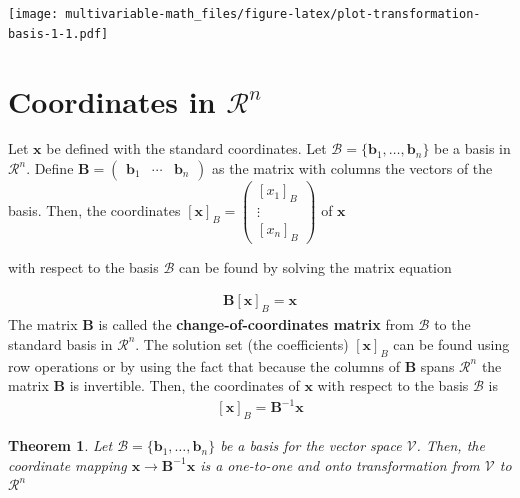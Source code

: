 \documentclass[
]{book}
\newtheorem{theorem}{Theorem}[chapter]
\theoremstyle{definition}
\theoremstyle{definition}
\theoremstyle{definition}
\theoremstyle{definition}
\theoremstyle{remark}
\begin{document}
\texttt{[image: multivariable-math\_files/figure-latex/plot-transformation-basis-1-1.pdf]}

\hypertarget{coordinates-in-mathcalrn}{%
\section{\texorpdfstring{Coordinates in \(\mathcal{R}^n\)}{Coordinates in \textbackslash mathcal\{R\}\^{}n}}\label{coordinates-in-mathcalrn}}

Let \(\mathbf{x}\) be defined with the standard coordinates. Let \(\mathcal{B} = \{ \mathbf{b}_1, \ldots, \mathbf{b}_n \}\) be a basis in \(\mathcal{R}^n\). Define \(\mathbf{B} = \begin{pmatrix} \mathbf{b}_1 & \cdots & \mathbf{b}_n \end{pmatrix}\) as the matrix with columns the vectors of the basis. Then, the coordinates \(\left[\mathbf{x}\right]_B = \begin{pmatrix} [x_1]_B \\ \vdots \\ [x_n]_B \end{pmatrix}\) of \(\mathbf{x}\)

with respect to the basis \(\mathcal{B}\) can be found by solving the matrix equation

\[
\begin{aligned}
\mathbf{B} \left[\mathbf{x}\right]_B = \mathbf{x}
\end{aligned}
\]
The matrix \(\mathbf{B}\) is called the \textbf{change-of-coordinates matrix} from \(\mathcal{B}\) to the standard basis in \(\mathcal{R}^n\). The solution set (the coefficients) \(\left[\mathbf{x}\right]_B\) can be found using row operations or by using the fact that because the columns of \(\mathbf{B}\) spans \(\mathcal{R}^n\) the matrix \(\mathbf{B}\) is invertible. Then, the coordinates of \(\mathbf{x}\) with respect to the basis \(\mathcal{B}\) is
\[
\begin{aligned}
\left[\mathbf{x}\right]_B = \mathbf{B}^{-1} \mathbf{x}
\end{aligned}
\]

\begin{theorem}
Let \(\mathcal{B} = \{ \mathbf{b}_1, \ldots, \mathbf{b}_n\}\) be a basis for the vector space \(\mathcal{V}\). Then, the coordinate mapping \(\mathbf{x} \rightarrow \mathbf{B}^{-1} \mathbf{x}\) is a one-to-one and onto transformation from \(\mathcal{V}\) to \(\mathcal{R}^n\)
\end{theorem}
\end{document}
